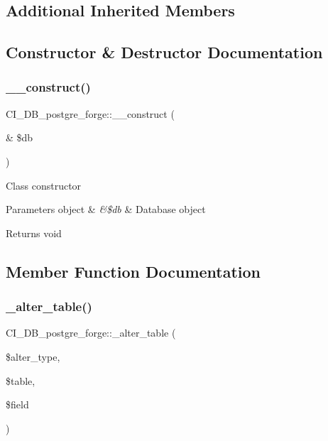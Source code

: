 \subsection*{Additional Inherited Members}


\subsection{Constructor \& Destructor Documentation}
\mbox{\label{class_c_i___d_b__postgre__forge_acb9e96ebb1c35461a6abbb5fdc131267}} 
\subsubsection{\texorpdfstring{\+\_\+\+\_\+construct()}{\_\_construct()}}
{\footnotesize\ttfamily C\+I\+\_\+\+D\+B\+\_\+postgre\+\_\+forge\+::\+\_\+\+\_\+construct (\begin{DoxyParamCaption}\item[{\&}]{\$db }\end{DoxyParamCaption})}

Class constructor


\begin{DoxyParams}[1]{Parameters}
object & {\em \&\$db} & Database object \\
\hline
\end{DoxyParams}
\begin{DoxyReturn}{Returns}
void 
\end{DoxyReturn}


\subsection{Member Function Documentation}
\mbox{\label{class_c_i___d_b__postgre__forge_a52fe37c1ca0f56d82748a0324c4c6afc}} 
\subsubsection{\texorpdfstring{\+\_\+alter\+\_\+table()}{\_alter\_table()}}
{\footnotesize\ttfamily C\+I\+\_\+\+D\+B\+\_\+postgre\+\_\+forge\+::\+\_\+alter\+\_\+table (\begin{DoxyParamCaption}\item[{}]{\$alter\+\_\+type,  }\item[{}]{\$table,  }\item[{}]{\$field }\end{DoxyParamCaption})\hspace{0.3cm}{\ttfamily [protected]}}

